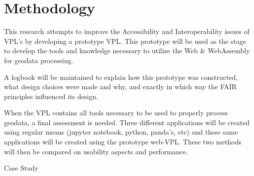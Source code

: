 \newpage
\section{Methodology}
This research attempts to improve the Accessibility and Interoperability issues of VPL's by developing a prototype VPL. 
This prototype will be used as the stage to develop the tools and knowledge necessary to utilize the Web \& WebAssembly for geodata processing.   

\par
A logbook will be maintained to explain how this prototype was constructed, what design choices were made and why, and exactly in which way the FAIR principles influenced its design. 

\par
When the VPL contains all tools necessary to be used to properly process geodata, a final assessment is needed. 
Three different applications will be created using regular means (jupyter notebook, python, panda's, etc)
and these same applications will be created using the prototype web-VPL. 
These two methods will then be compared on usability aspects and performance.   

Case Study